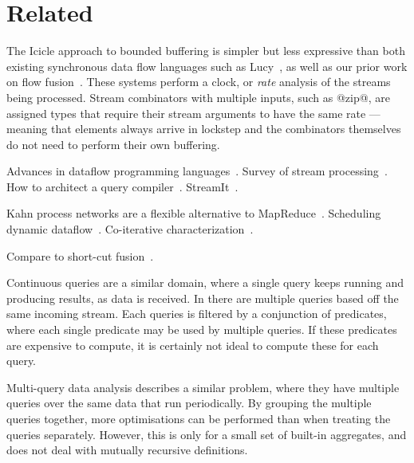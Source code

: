 \section{Related}
\label{s:Related}

The Icicle approach to bounded buffering is simpler but less expressive than both existing synchronous data flow languages such as Lucy~\cite{mandel2010lucy}, as well as our prior work on flow fusion~\cite{lippmeier2013data}. These systems perform a clock, or \emph{rate} analysis of the streams being processed. Stream combinators with multiple inputs, such as @zip@, are assigned types that require their stream arguments to have the same rate --- meaning that elements always arrive in lockstep and the combinators themselves do not need to perform their own buffering.

Advances in dataflow programming languages~\cite{johnston2004advances}.
Survey of stream processing~\cite{stephens1997survey}.
How to architect a query compiler~\cite{shaikhha2016architect}.
StreamIt~\cite{thies2002streamit}.

Kahn process networks are a flexible alternative to MapReduce~\cite{vrba2009kahn}.
Scheduling dynamic dataflow~\cite{buck1993scheduling}.
Co-iterative characterization~\cite{caspi1998co}.

Compare to short-cut fusion~\cite{coutts2007stream}.

Continuous queries are a similar domain, where a single query keeps running and producing results, as data is received.
In \cite{munagala2007optimization} there are multiple queries based off the same incoming stream.
Each queries is filtered by a conjunction of predicates, where each single predicate may be used by multiple queries.
If these predicates are expensive to compute, it is certainly not ideal to compute these for each query.

Multi-query data analysis\cite{andrade2003efficient} describes a similar problem, where they have multiple queries over the same data that run periodically.
By grouping the multiple queries together, more optimisations can be performed than when treating the queries separately.
However, this is only for a small set of built-in aggregates, and does not deal with mutually recursive definitions.


